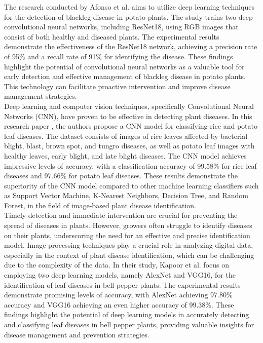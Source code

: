 \documentclass[conference]{IEEEtran}
\begin{document}
The research conducted by Afonso et al. \cite{AFONSO20196} aims to utilize deep learning techniques for the detection of blackleg disease in potato plants. The study trains two deep convolutional neural networks, including ResNet18, using RGB images that consist of both healthy and diseased plants. The experimental results demonstrate the effectiveness of the ResNet18 network, achieving a precision rate of 95\% and a recall rate of 91\% for identifying the disease. These findings highlight the potential of convolutional neural networks as a valuable tool for early detection and effective management of blackleg disease in potato plants. This technology can facilitate proactive intervention and improve disease management strategies.\\

 Deep learning and computer vision techniques, specifically Convolutional Neural Networks (CNN), have proven to be effective in detecting plant diseases. In this research paper \cite{sharma2022plant}, the authors propose a CNN model for classifying rice and potato leaf diseases. The dataset consists of images of rice leaves affected by bacterial blight, blast, brown spot, and tungro diseases, as well as potato leaf images with healthy leaves, early blight, and late blight diseases. The CNN model achieves impressive levels of accuracy, with a classification accuracy of 99.58\% for rice leaf diseases and 97.66\% for potato leaf diseases. These results demonstrate the superiority of the CNN model compared to other machine learning classifiers such as Support Vector Machine, K-Nearest Neighbors, Decision Tree, and Random Forest, in the field of image-based plant disease identification.\\

Timely detection and immediate intervention are crucial for preventing the spread of diseases in plants. However, growers often struggle to identify diseases on their plants, underscoring the need for an effective and precise identification model. Image processing techniques play a crucial role in analyzing digital data, especially in the context of plant disease identification, which can be challenging due to the complexity of the data. In their study, Kapoor et al. \cite{kapoor2023bell} focus on employing two deep learning models, namely AlexNet and VGG16, for the identification of leaf diseases in bell pepper plants. The experimental results demonstrate promising levels of accuracy, with AlexNet achieving 97.80\% accuracy and VGG16 achieving an even higher accuracy of 99.38\%. These findings highlight the potential of deep learning models in accurately detecting and classifying leaf diseases in bell pepper plants, providing valuable insights for disease management and prevention strategies.\\
\end{document}
